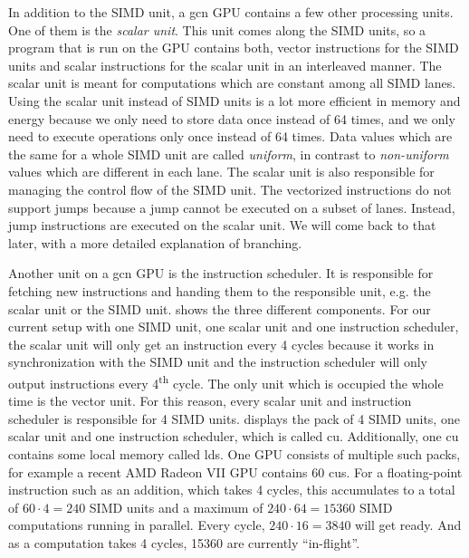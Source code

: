 In addition to the SIMD unit, a \gls{gcn} GPU contains a few other processing units. One of them is the \emph{scalar unit}. This unit comes along the SIMD units, so a program that is run on the GPU contains both, vector instructions for the SIMD units and scalar instructions for the scalar unit in an interleaved manner. The scalar unit is meant for computations which are constant among all SIMD lanes. Using the scalar unit instead of SIMD units is a lot more efficient in memory and energy because we only need to store data once instead of 64 times, and we only need to execute operations only once instead of 64 times. Data values which are the same for a whole SIMD unit are called \emph{uniform}, in contrast to \emph{non-uniform} values which are different in each lane. The scalar unit is also responsible for managing the control flow of the SIMD unit. The vectorized instructions do not support jumps because a jump cannot be executed on a subset of lanes. Instead, jump instructions are executed on the scalar unit. We will come back to that later, with a more detailed explanation of branching.



Another unit on a \gls{gcn} GPU is the instruction scheduler. It is responsible for fetching new instructions and handing them to the responsible unit, e.g. the scalar unit or the SIMD unit.  shows the three different components. For our current setup with one SIMD unit, one scalar unit and one instruction scheduler, the scalar unit will only get an instruction every 4 cycles because it works in synchronization with the SIMD unit and the instruction scheduler will only output instructions every 4\textsuperscript{th} cycle. The only unit which is occupied the whole time is the vector unit. For this reason, every scalar unit and instruction scheduler is responsible for 4 SIMD units.  displays the pack of 4 SIMD units, one scalar unit and one instruction scheduler, which is called \gls{cu}. Additionally, one \gls{cu} contains some local memory called \gls{lds}. One GPU consists of multiple such packs, for example a recent AMD Radeon VII GPU contains 60 \glspl{cu}. For a floating-point instruction such as an addition, which takes 4 cycles, this accumulates to a total of $60 \cdot 4 = 240$ SIMD units and a maximum of $240 \cdot 64 = 15360$ SIMD computations running in parallel. Every cycle, $240 \cdot 16 = 3840$ will get ready. And as a computation takes 4 cycles, 15360 are currently \enquote{in-flight}.

